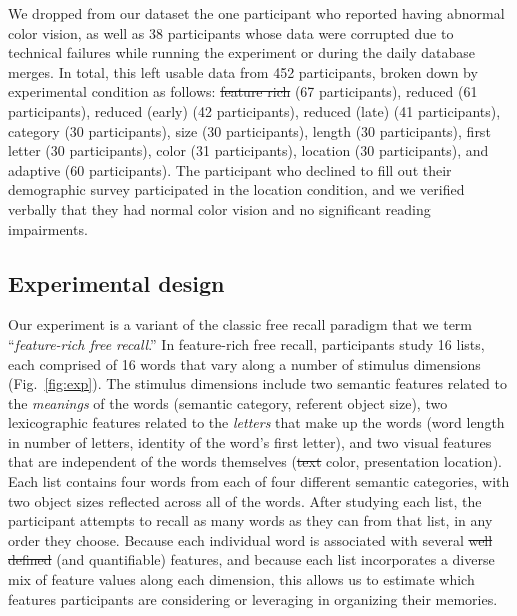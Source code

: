 \documentclass[11pt]{article}
\providecommand{\DIFaddtex}[1]{{\protect\color{blue}\uwave{#1}}} %
\providecommand{\DIFdeltex}[1]{{\protect\color{red}\sout{#1}}}                      %
\providecommand{\DIFaddbegin}{} %
\providecommand{\DIFaddend}{} %
\providecommand{\DIFdelbegin}{} %
\providecommand{\DIFdelend}{} %
\providecommand{\DIFadd}[1]{\texorpdfstring{\DIFaddtex{#1}}{#1}} %
\providecommand{\DIFdel}[1]{\texorpdfstring{\DIFdeltex{#1}}{}} %
\newcommand{\DIFscaledelfig}{0.5}
\newlength{\DIFdelgraphicswidth} %
\newlength{\DIFdelgraphicsheight} %
\newcommand{\DIFaddincludegraphics}[2][]{{\color{blue}\fbox{\DIFOincludegraphics[#1]{#2}}}} %
\newcommand{\DIFdelincludegraphics}[2][]{%
\sbox{\DIFdelgraphicsbox}{\DIFOincludegraphics[#1]{#2}}%
\settoboxwidth{\DIFdelgraphicswidth}{\DIFdelgraphicsbox} %
\settoboxtotalheight{\DIFdelgraphicsheight}{\DIFdelgraphicsbox} %
\scalebox{\DIFscaledelfig}{%
\parbox[b]{\DIFdelgraphicswidth}{\usebox{\DIFdelgraphicsbox}\\[-\baselineskip] \rule{\DIFdelgraphicswidth}{0em}}\llap{\resizebox{\DIFdelgraphicswidth}{\DIFdelgraphicsheight}{%
\setlength{\unitlength}{\DIFdelgraphicswidth}%
\begin{picture}(1,1)%
\thicklines\linethickness{2pt} %
{\color[rgb]{1,0,0}\put(0,0){\framebox(1,1){}}}%
{\color[rgb]{1,0,0}\put(0,0){\line( 1,1){1}}}%
{\color[rgb]{1,0,0}\put(0,1){\line(1,-1){1}}}%
\end{picture}%
}\hspace*{3pt}}} %
} %
\DeclareRobustCommand{\DIFaddbegin}{\DIFOaddbegin \let\includegraphics\DIFaddincludegraphics} %
\DeclareRobustCommand{\DIFaddend}{\DIFOaddend \let\includegraphics\DIFOincludegraphics} %
\DeclareRobustCommand{\DIFdelbegin}{\DIFOdelbegin \let\includegraphics\DIFdelincludegraphics} %
\DeclareRobustCommand{\DIFdelend}{\DIFOaddend \let\includegraphics\DIFOincludegraphics} %
\begin{document}
We dropped from our dataset the one participant who reported having abnormal
color vision, as well as 38 participants whose data were corrupted due to
technical failures while running the experiment or during the daily database
merges. In total, this left usable data from 452 participants, broken down by
experimental condition as follows: \DIFdelbegin \DIFdel{feature rich }\DIFdelend \DIFaddbegin \DIFadd{feature-rich }\DIFaddend (67 participants), reduced (61
participants), reduced (early) (42 participants), reduced (late) (41
participants), category (30 participants), size (30 participants), length (30
participants), first letter (30 participants), color (31 participants),
location (30 participants), and adaptive (60 participants). The participant who
declined to fill out their demographic survey participated in the location
condition, and we verified verbally that they had normal color vision and no
significant reading impairments.




\subsection*{Experimental design}

Our experiment is a variant of the classic free recall paradigm that we term
``\textit{feature-rich free recall}.'' In feature-rich free recall,
participants study 16 lists, each comprised of 16 words that vary along a
number of stimulus dimensions (Fig.~\ref{fig:exp}). The stimulus dimensions
include two semantic features related to the \textit{meanings} of the words
(semantic category, referent object size), two lexicographic features related
to the \textit{letters} that make up the words (word length in number of
letters, identity of the word's first letter), and two visual features that are
independent of the words themselves (\DIFdelbegin \DIFdel{text }\DIFdelend \DIFaddbegin \DIFadd{font }\DIFaddend color, presentation location). Each
list contains four words from each of four different semantic categories, with
two \DIFaddbegin \DIFadd{referent }\DIFaddend object sizes reflected across all of the words. After studying
each list, the participant attempts to recall as many words as they can from
that list, in any order they choose. Because each individual word is associated
with several \DIFdelbegin \DIFdel{well defined }\DIFdelend \DIFaddbegin \DIFadd{well-defined }\DIFaddend (and quantifiable) features, and because each list
incorporates a diverse mix of feature values along each dimension, this allows
us to estimate which features participants are considering or leveraging in
organizing their memories.
\end{document}
